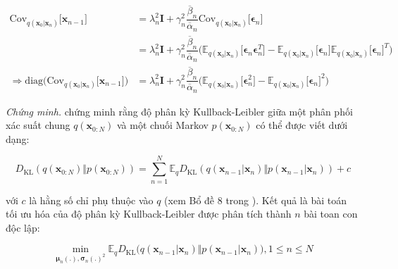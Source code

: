 \documentclass[14pt, a4paper]{article}
\numberwithin{equation}{section}
\numberwithin{figure}{section}
\numberwithin{dl}{section}
\numberwithin{md}{section}
\numberwithin{bd}{section}
\numberwithin{dn}{section}
\numberwithin{hq}{section}
\begin{document}
    \begin{equation}
        \begin{aligned}
            \mathrm{Cov}_{q(\boldsymbol{x}_0 \vert \boldsymbol{x}_n)} \lbrack \boldsymbol{x}_{n-1} \rbrack &= \lambda_n^2 \boldsymbol{I} + \gamma_n^2 \dfrac{\overline{\beta}_n}{\overline{\alpha}_n} \mathrm{Cov}_{q(\boldsymbol{x}_0 \vert \boldsymbol{x}_n)} \lbrack \boldsymbol{\epsilon}_n \rbrack \\
            &= \lambda_n^2 \boldsymbol{I} + \gamma_n^2 \dfrac{\overline{\beta}_n}{\overline{\alpha}_n} \big( \mathbb{E}_{q(\boldsymbol{x}_0 \vert \boldsymbol{x}_n)} \lbrack \boldsymbol{\epsilon}_n \boldsymbol{\epsilon}_n^T \rbrack - \mathbb{E}_{q(\boldsymbol{x}_0 \vert \boldsymbol{x}_n)} \lbrack \boldsymbol{\epsilon}_n \rbrack \mathbb{E}_{q(\boldsymbol{x}_0 \vert \boldsymbol{x}_n)} \lbrack \boldsymbol{\epsilon}_n \rbrack^T \big) \\
            \Rightarrow \mathrm{diag} \big( \mathrm{Cov}_{q(\boldsymbol{x}_0 \vert \boldsymbol{x}_n)} \lbrack \boldsymbol{x}_{n-1} \rbrack \big) &= \lambda_n^2 \boldsymbol{I} + \gamma_n^2 \dfrac{\overline{\beta}_n}{\overline{\alpha}_n} \big( \mathbb{E}_{q(\boldsymbol{x}_0 \vert \boldsymbol{x}_n)} \lbrack \boldsymbol{\epsilon}_n^2 \rbrack - \mathbb{E}_{q(\boldsymbol{x}_0 \vert \boldsymbol{x}_n)} \lbrack \boldsymbol{\epsilon}_n \rbrack^2 \big)
        \end{aligned}
    \end{equation}

    \joint*

    \textit{Chứng minh.}
    \cite{bao2021analytic} chứng minh rằng độ phân kỳ Kullback-Leibler giữa một phân phối xác suất chung $q(\boldsymbol{x}_{0:N})$ và một chuối Markov $p(\boldsymbol{x}_{0:N})$ có thể được viết dưới dạng:

    \begin{equation}
        D_{\mathrm{KL}} (q(\boldsymbol{x}_{0:N}) \Vert p(\boldsymbol{x}_{0:N}))=\sum_{n=1}^N \mathbb{E}_{q} D_{\mathrm{KL}} (q(\boldsymbol{x}_{n-1} \vert \boldsymbol{x}_n) \Vert p(\boldsymbol{x}_{n-1} \vert \boldsymbol{x}_n)) + c
    \end{equation}

    với $c$ là hằng số chỉ phụ thuộc vào $q$ (xem Bổ đề 8 trong \cite{bao2021analytic}). 
    Kết quả là bài toán tối ưu hóa của độ phân kỳ Kullback-Leibler được phân tích thành $n$ bài toan con độc lập:

    \begin{equation}
        \min_{\boldsymbol{\mu}_n (.), \boldsymbol{\sigma}_n (.)^2} \mathbb{E}_q D_{\mathrm{KL}} \big( q(\boldsymbol{x}_{n-1} \vert \boldsymbol{x}_n) \Vert p(\boldsymbol{x}_{n-1} \vert \boldsymbol{x}_n) \big), 1 \leq n \leq N
    \end{equation}
\end{document}
